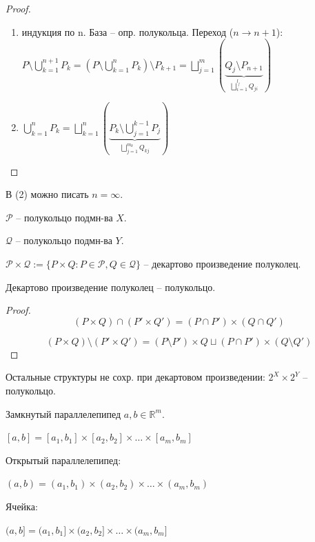 \begin{proof}
    \begin{enumerate}
        \item индукция по n. База -- опр. полукольца. Переход ($n \rightarrow n+1$): $P \setminus \bigcup_{k=1}^{n+1}P_k = \left(P \setminus \bigcup_{k=1}^nP_k\right) \setminus P_{k+1} = \bigsqcup_{j=1}^{m} \left(\underbrace{Q_j \setminus P_{n+1}}_{\bigsqcup_{i=1}^{l_j}Q_{ji}}\right)$
        \item $\bigcup_{k=1}^{n} P_k = \bigsqcup_{k=1}^{n} \left(\underbrace{P_k \setminus \bigcup_{j=1}^{k-1} P_j}_{\bigsqcup_{j=1}^{m_k} Q_{kj}}\right)$
    \end{enumerate}
\end{proof}

\begin{remark}
    В (2) можно писать $n = \infty$.
\end{remark}

\begin{definition}
    $\mathcal{P}$ -- полукольцо подмн-ва $X$.

    $\mathcal{Q}$ -- полукольцо подмн-ва $Y$.

    $\mathcal{P} \times \mathcal{Q} := \{P \times Q : P \in \mathcal{P}, Q \in \mathcal{Q}\}$ -- декартово произведение полуколец.
\end{definition}

\begin{theorem}
    Декартово произведение полуколец -- полукольцо.
\end{theorem}
\begin{proof}
    
    $$(P \times Q) \cap (P' \times Q') = (P \cap P') \times (Q \cap Q')$$

    $$(P \times Q) \setminus (P' \times Q') = (P \setminus P') \times Q \sqcup (P \cap P') \times (Q \setminus Q')$$
\end{proof}

\begin{remark}
    Остальные структуры не сохр. при декартовом произведении: $2^X \times 2^Y$ -- полукольцо.
\end{remark}

\begin{definition}
    Замкнутый параллелепипед $a, b \in \mathbb{R}^m$.

    $[a, b] = [a_1, b_1] \times [a_2, b_2] \times \dots \times [a_m, b_m]$

    Открытый параллелепипед:

    $(a, b) = (a_1, b_1) \times (a_2, b_2) \times \dots \times (a_m, b_m)$

    Ячейка:
    
    $(a, b] = (a_1, b_1] \times (a_2, b_2] \times \dots \times (a_m, b_m]$
\end{definition}

